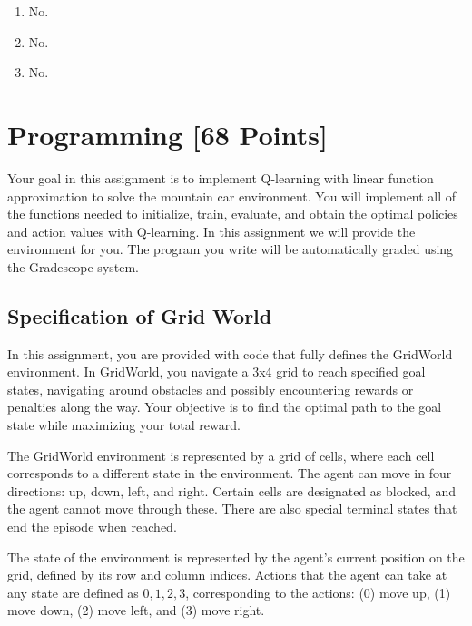 \documentclass[11pt,addpoints,answers]{exam}
\begin{document}
\begin{your_solution}[height=6cm]
\begin{enumerate}
	\item No.
	\item No.
	\item No.
\end{enumerate}
\end{your_solution}
\newpage
\section{Programming [68 Points]}
\label{sec:code}

Your goal in this assignment is to implement Q-learning with linear function approximation to solve the mountain car environment. You will implement all of the functions needed to initialize, train, evaluate, and obtain the optimal policies and action values with Q-learning. In this assignment we will provide the environment for you. The program you write will be automatically graded using the Gradescope system.


\subsection{Specification of Grid World}
In this assignment, you are provided with code that fully defines the GridWorld environment. In GridWorld, you navigate a 3x4 grid to reach specified goal states, navigating around obstacles and possibly encountering rewards or penalties along the way. Your objective is to find the optimal path to the goal state while maximizing your total reward.

The GridWorld environment is represented by a grid of cells, where each cell corresponds to a different state in the environment. The agent can move in four directions: up, down, left, and right. Certain cells are designated as blocked, and the agent cannot move through these. There are also special terminal states that end the episode when reached.

The state of the environment is represented by the agent's current position on the grid, defined by its row and column indices. Actions that the agent can take at any state are defined as ${0, 1, 2, 3}$, corresponding to the actions: (0) move up, (1) move down, (2) move left, and (3) move right.
\end{document}
